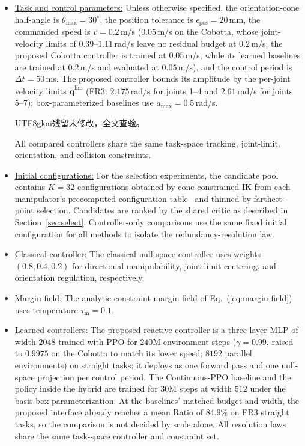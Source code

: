 \documentclass[journal, twoside]{IEEEtran}
\newcommand{\xinyi}[1]{{\color{darkorange}\begin{CJK*}{UTF8}{gkai}#1\end{CJK*}}}
\begin{document}
\begin{itemize}[leftmargin=1em]
\renewcommand{\labelitemi}{$\triangleright$}

    \item \uline{Task and control parameters:}
    Unless otherwise specified, the orientation-cone half-angle is
    $\theta_{\max}=30^{\circ}$, the position tolerance is
    $\epsilon_{\mathrm{pos}}=20$\,mm, the commanded speed is
    $v=0.2$\,m/s ($0.05$\,m/s on the Cobotta, whose joint-velocity
    limits of $0.39$--$1.11$\,rad/s leave no residual budget at
    $0.2$\,m/s; the proposed Cobotta controller is trained at
    $0.05$\,m/s, while its learned baselines are trained at $0.2$\,m/s
    and evaluated at $0.05$\,m/s), and the control period is
    $\Delta t=50$\,ms. The
    proposed controller bounds its amplitude by the per-joint velocity
    limits $\dot{\mathbf{q}}^{\lim}$ (FR3: $2.175$\,rad/s for joints 1--4
    and $2.61$\,rad/s for joints 5--7); box-parameterized baselines use
    $a_{\max}=0.5$\,rad/s.\xinyi{残留未修改，全文查验。} All compared controllers share the same
    task-space tracking, joint-limit, orientation, and collision
    constraints.

    \item \uline{Initial configurations:}
    For the selection experiments, the candidate pool contains $K=32$
    configurations obtained by cone-constrained IK from each
    manipulator's precomputed configuration
    table~\cite{yuan2026iksel} and thinned by farthest-point selection.
    Candidates are ranked by the shared critic as described in
    Section~\ref{sec:select}. Controller-only comparisons use the same
    fixed initial configuration for all methods to isolate the
    redundancy-resolution law.

    \item \uline{Classical controller:}
    The classical null-space controller uses weights $(0.8,0.4,0.2)$ for
    directional manipulability, joint-limit centering, and orientation
    regulation, respectively.

    \item \uline{Margin field:}
    The analytic constraint-margin field of Eq.~(\ref{eq:margin-field})
    uses temperature $\tau_{\mathrm{m}}=0.1$.

    \item \uline{Learned controllers:}
    The proposed reactive controller is a three-layer MLP of width
    $2048$ trained with PPO for $240$M environment steps
    ($\gamma=0.99$, raised to $0.9975$ on the Cobotta to match its lower
    speed; $8192$ parallel environments) on straight tasks; it
    deploys as one forward pass and one null-space projection per
    control period. The Continuous-PPO baseline and the policy
    inside the hybrid are trained for $30$M steps at width $512$ under
    the basis-box parameterization. At the baselines'
    matched budget and width, the proposed interface already reaches a
    mean Ratio of $84.9\%$ on FR3 straight tasks, so the comparison is
    not decided by scale alone. All resolution laws share the same
    task-space controller and constraint set.


\end{itemize}
\end{document}
